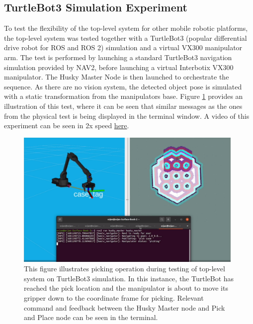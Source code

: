 \FloatBarrier
\subsection{TurtleBot3 Simulation Experiment}
To test the flexibility of the top-level system for other mobile robotic platforms, the top-level system was tested together with a TurtleBot3 (popular differential drive robot for ROS and ROS 2) simulation and a virtual VX300 manipulator arm. The test is performed by launching a standard TurtleBot3 navigation simulation provided by NAV2, before launching a virtual Interbotix VX300 manipulator. The Husky Master Node is then launched to orchestrate the sequence. As there are no vision system, the detected object pose is simulated with a static transformation from the manipulators base. Figure \ref{fig:R:WA:simTBTopLevel2} provides an illustration of this test, where it can be seen that similar messages as the ones from the physical test is being displayed in the terminal window. A video of this experiment can be seen in 2x speed \href{https://youtu.be/_Dy3rSTHWYo}{here}. 

\begin{figure}[htp!]
  \centering
  \includegraphics[width = 0.98\textwidth]{Figures/figSimTBTopLevel2.pdf}
  \caption{This figure illustrates picking operation during testing of top-level system on TurtleBot3 simulation. In this instance, the TurtleBot has reached the pick location and the manipulator is about to move its gripper down to the coordinate frame for picking. Relevant command and feedback between the Husky Master node and Pick and Place node can be seen in the terminal.}
  \label{fig:R:WA:simTBTopLevel2}
\end{figure}





